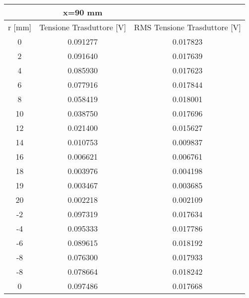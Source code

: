 \begin{table}[ht!]
\centering
\begin{tabular}{|c|c|c|}
\hline
           & x=90 mm                     &                                  \\ \hline
r {[}mm{]} & Tensione Trasduttore {[}V{]} & RMS Tensione Trasduttore {[}V{]} \\ \hline
0          & 0.091277                     & 0.017823                         \\ \hline
2          & 0.091640                     & 0.017639                         \\ \hline
4          & 0.085930                     & 0.017623                         \\ \hline
6          & 0.077916                     & 0.017844                         \\ \hline
8          & 0.058419                     & 0.018001                         \\ \hline
10         & 0.038750                     & 0.017696                         \\ \hline
12         & 0.021400                     & 0.015627                         \\ \hline
14         & 0.010753                     & 0.009837                         \\ \hline
16         & 0.006621                     & 0.006761                         \\ \hline
18         & 0.003976                     & 0.004198                         \\ \hline
19         & 0.003467                     & 0.003685                         \\ \hline
20         & 0.002218                     & 0.002109                         \\ \hline
-2         & 0.097319                     & 0.017634                         \\ \hline
-4         & 0.095333                     & 0.017786                         \\ \hline
-6         & 0.089615                     & 0.018192                         \\ \hline
-8         & 0.076300                     & 0.017933                         \\ \hline
-8         & 0.078664                     & 0.018242                         \\ \hline
0          & 0.097486                     & 0.017668                         \\ \hline

\end{tabular}
\end{table}
